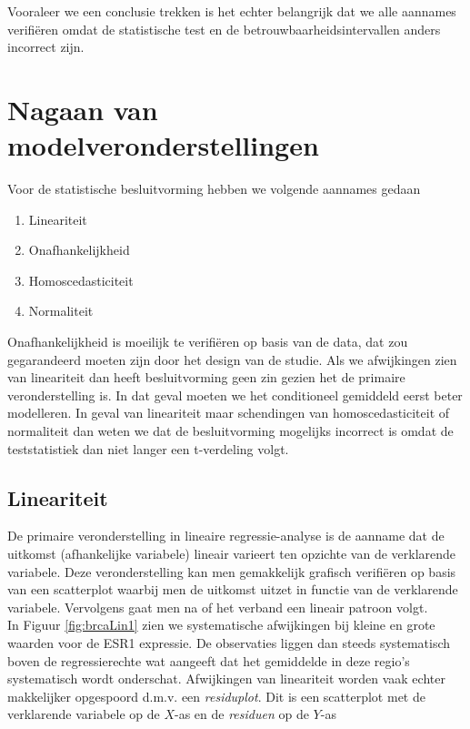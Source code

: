 \documentclass[
  12pt,dutch]{book}
\providecommand{\tightlist}{%
  \setlength{\itemsep}{0pt}\setlength{\parskip}{0pt}}
\theoremstyle{definition}
\theoremstyle{definition}
\theoremstyle{definition}
\theoremstyle{definition}
\theoremstyle{remark}
\begin{document}
Vooraleer we een conclusie trekken is het echter belangrijk dat we alle aannames verifiëren omdat de statistische test en de betrouwbaarheidsintervallen anders incorrect zijn.

\section{Nagaan van modelveronderstellingen}\label{nagaan-van-modelveronderstellingen}

Voor de statistische besluitvorming hebben we volgende aannames gedaan

\begin{enumerate}
\def\labelenumi{\arabic{enumi}.}
\tightlist
\item
  Lineariteit
\item
  Onafhankelijkheid\\
\item
  Homoscedasticiteit
\item
  Normaliteit
\end{enumerate}

Onafhankelijkheid is moeilijk te verifiëren op basis van de data, dat zou gegarandeerd moeten zijn door het design van de studie.
Als we afwijkingen zien van lineariteit dan heeft besluitvorming geen zin gezien het de primaire veronderstelling is.
In dat geval moeten we het conditioneel gemiddeld eerst beter modelleren.
In geval van lineariteit maar schendingen van homoscedasticiteit of normaliteit dan weten we dat de besluitvorming mogelijks incorrect is omdat de teststatistiek dan niet langer een t-verdeling volgt.

\subsection{Lineariteit}\label{lineariteit}

De primaire veronderstelling in lineaire regressie-analyse is de aanname dat de uitkomst (afhankelijke variabele) lineair varieert ten opzichte van de verklarende variabele. Deze veronderstelling kan men gemakkelijk grafisch verifiëren op basis van een scatterplot waarbij men de uitkomst uitzet in functie van de verklarende variabele. Vervolgens gaat men na of het verband een lineair patroon volgt.\\
In Figuur \ref{fig:brcaLin1} zien we systematische afwijkingen bij kleine en grote waarden voor de ESR1 expressie.
De observaties liggen dan steeds systematisch boven de regressierechte wat aangeeft dat het gemiddelde in deze regio's systematisch wordt onderschat.
Afwijkingen van lineariteit worden vaak echter makkelijker opgespoord d.m.v. een \emph{residuplot}. Dit is een scatterplot met de
verklarende variabele op de \(X\)-as en de \emph{residuen} op de \(Y\)-as
\end{document}
